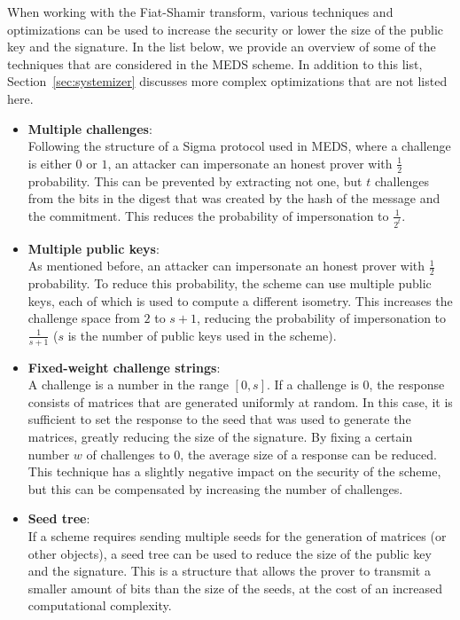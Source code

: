 \documentclass[11pt,a4paper]{report}
\theoremstyle{definition}
\begin{document}
When working with the Fiat-Shamir transform, various techniques and optimizations can be used to increase the security or lower the size of the public key and the signature. In the list below, we provide an overview of some of the techniques that are considered in the MEDS scheme. In addition to this list, Section~\ref{sec:systemizer} discusses more complex optimizations that are not listed here.
\begin{itemize}
  \item \textbf{Multiple challenges}:\\
        Following the structure of a Sigma protocol used in MEDS, where a challenge is either $0$ or $1$, an attacker can impersonate an honest prover with $\frac{1}{2}$ probability. This can be prevented by extracting not one, but $t$ challenges from the bits in the digest that was created by the hash of the message and the commitment. This reduces the probability of impersonation to $\frac{1}{2^t}$.
  \item \textbf{Multiple public keys}:\\
        As mentioned before, an attacker can impersonate an honest prover with $\frac{1}{2}$ probability. To reduce this probability, the scheme can use multiple public keys, each of which is used to compute a different isometry. This increases the challenge space from $2$ to $s + 1$, reducing the probability of impersonation to $\frac{1}{s + 1}$ ($s$ is the number of public keys used in the scheme).
  \item \textbf{Fixed-weight challenge strings}:\\
        A challenge is a number in the range $[0, s]$. If a challenge is 0, the response consists of matrices that are generated uniformly at random. In this case, it is sufficient to set the response to the seed that was used to generate the matrices, greatly reducing the size of the signature. By fixing a certain number $w$ of challenges to 0, the average size of a response can be reduced. This technique has a slightly negative impact on the security of the scheme, but this can be compensated by increasing the number of challenges.
  \item \textbf{Seed tree}:\\
        If a scheme requires sending multiple seeds for the generation of matrices (or other objects), a seed tree can be used to reduce the size of the public key and the signature. This is a structure that allows the prover to transmit a smaller amount of bits than the size of the seeds, at the cost of an increased computational complexity.
\end{itemize}
\end{document}
